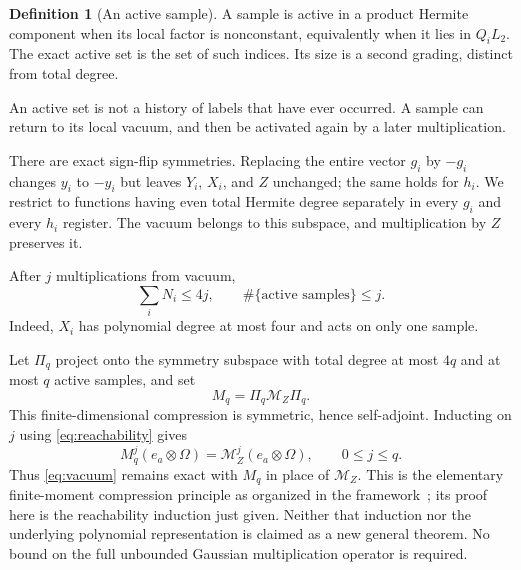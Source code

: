 \documentclass[11pt]{article}
\numberwithin{equation}{section}
\theoremstyle{definition}\newtheorem{definition}[theorem]{Definition}
\theoremstyle{remark}\newtheorem{remark}[theorem]{Remark}
\begin{document}
\begin{definition}[An active sample]
A sample is active in a product Hermite component when its local factor is
nonconstant, equivalently when it lies in $Q_iL_2$. The exact active set is the
set of such indices. Its size is a second grading, distinct from total degree.
\end{definition}
An active set is not a history of labels that have ever occurred. A sample can
return to its local vacuum, and then be activated again by a later multiplication.

There are exact sign-flip symmetries. Replacing the entire vector $g_i$ by $-g_i$
changes $y_i$ to $-y_i$ but leaves $Y_i$, $X_i$, and $Z$ unchanged; the same holds
for $h_i$. We restrict to functions having even total Hermite degree separately
in every $g_i$ and every $h_i$ register. The vacuum belongs to this subspace,
and multiplication by $Z$ preserves it.

After $j$ multiplications from vacuum,
\begin{equation}\label{eq:reachability}
 \sum_iN_i\le4j,\qquad \#\{\text{active samples}\}\le j.
\end{equation}
Indeed, $X_i$ has polynomial degree at most four and acts on only one sample.

Let $\Pi_q$ project onto the symmetry subspace with total degree at most $4q$
and at most $q$ active samples, and set
\begin{equation}\label{eq:cutoff}
 M_q=\Pi_q\mathcal M_Z\Pi_q.
\end{equation}
This finite-dimensional compression is symmetric, hence self-adjoint.
Inducting on $j$ using
\eqref{eq:reachability} gives
\begin{equation}\label{eq:exact-cutoff}
 M_q^j(e_a\otimes\Omega)=\mathcal M_Z^j(e_a\otimes\Omega),\qquad 0\le j\le q.
\end{equation}
Thus \eqref{eq:vacuum} remains exact with $M_q$ in place of $\mathcal M_Z$.
This is the elementary finite-moment compression principle as organized in the
framework~\cite{Framework}; its proof here is the reachability induction just
given. Neither that induction nor the underlying polynomial representation is
claimed as a new general theorem. No bound on the full unbounded Gaussian
multiplication operator is required.
\end{document}
